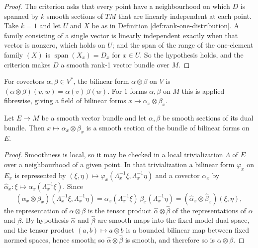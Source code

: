 \begin{proof}
\leanok
{}
The criterion asks that every point have a neighbourhood on which $D$ is spanned by $k$ smooth sections of $TM$ that are linearly independent at each point. Take $k=1$ and let $U$ and $X$ be as in Definition \ref{def:rank-one-distribution}. A family consisting of a single vector is linearly independent exactly when that vector is nonzero, which holds on $U$; and the span of the range of the one-element family $(X)$ is $\operatorname{span}(X_x) = D_x$ for $x \in U$. So the hypothesis holds, and the criterion makes $D$ a smooth rank-1 vector bundle over $M$.
\end{proof}

\begin{definition}
\label{def:tensor-product-one-forms}
\leanok
For covectors $\alpha, \beta \in V^*$, the bilinear form $\alpha \otimes \beta$ on $V$ is $(\alpha \otimes \beta)(v,w) = \alpha(v)\,\beta(w)$. For $1$-forms $\alpha, \beta$ on $M$ this is applied fibrewise, giving a field of bilinear forms $x \mapsto \alpha_x \otimes \beta_x$.
\end{definition}

\begin{lemma}
\label{lem:tensor-product-one-forms-smooth}
\leanok
{}
Let $E \to M$ be a smooth vector bundle and let $\alpha, \beta$ be smooth sections of its dual bundle. Then $x \mapsto \alpha_x \otimes \beta_x$ is a smooth section of the bundle of bilinear forms on $E$.
\end{lemma}

\begin{proof}
\leanok
{}
Smoothness is local, so it may be checked in a local trivialization $\Lambda$ of $E$ over a neighbourhood of a given point. In that trivialization a bilinear form $\varphi_x$ on $E_x$ is represented by $(\xi,\eta) \mapsto \varphi_x(\Lambda_x^{-1}\xi, \Lambda_x^{-1}\eta)$ and a covector $\alpha_x$ by $\hat\alpha_x \colon \xi \mapsto \alpha_x(\Lambda_x^{-1}\xi)$. Since
\[
  (\alpha_x \otimes \beta_x)(\Lambda_x^{-1}\xi, \Lambda_x^{-1}\eta) = \alpha_x(\Lambda_x^{-1}\xi)\,\beta_x(\Lambda_x^{-1}\eta) = (\hat\alpha_x \otimes \hat\beta_x)(\xi,\eta),
\]
the representation of $\alpha \otimes \beta$ is the tensor product $\hat\alpha \otimes \hat\beta$ of the representations of $\alpha$ and $\beta$. By hypothesis $\hat\alpha$ and $\hat\beta$ are smooth maps into the fixed model dual space, and the tensor product $(a,b) \mapsto a \otimes b$ is a bounded bilinear map between fixed normed spaces, hence smooth; so $\hat\alpha \otimes \hat\beta$ is smooth, and therefore so is $\alpha \otimes \beta$.
\end{proof}

